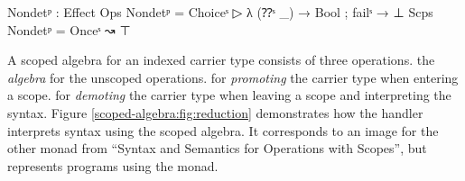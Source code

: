 \begin{code}
Nondetᵖ : Effect
Ops   Nondetᵖ = Choiceˢ  ▷ λ{ (⁇ˢ _) → Bool ; failˢ → ⊥ }
Scps  Nondetᵖ = Onceˢ    ↝ ⊤
\end{code}
A scoped algebra for an  indexed carrier type 
consists of three operations.
 the \textit{algebra} for the unscoped operations.
 for \textit{promoting} the carrier type when entering a scope.
 for \textit{demoting} the carrier type when leaving a scope and
interpreting the syntax.
Figure \ref{scoped-algebra:fig:reduction} demonstrates how the handler
interprets  syntax using the scoped algebra.
It corresponds to an image for the other monad from ``Syntax and Semantics for
Operations with Scopes'', but represents programs using the
\AgdaSpace{} monad.

